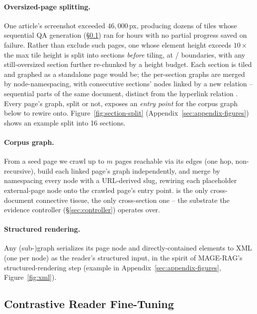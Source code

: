 \paragraph{Oversized-page splitting.} One article's screenshot exceeded $46{,}000$\,px, producing dozens of tiles whose sequential QA generation (\S\ref{sec:contrastive}) ran for hours with no partial progress saved on failure. Rather than exclude such pages, one whose element height exceeds $10\times$ the max tile height is split into sections \emph{before} tiling, at / boundaries, with any still-oversized section further re-chunked by a height budget. Each section is tiled and graphed as a standalone page would be; the per-section graphs are merged by node-namespacing, with consecutive sections'  nodes linked by a new \textbf{} relation -- sequential parts of the same document, distinct from the hyperlink relation . Every page's graph, split or not, exposes an \emph{entry point} for the corpus graph below to rewire onto. Figure~\ref{fig:section-split} (Appendix~\ref{sec:appendix-figures}) shows an example split into 16 sections.

\paragraph{Corpus graph.} From a seed page we crawl up to $m$ pages reachable via its  edges (one hop, non-recursive), build each linked page's graph independently, and merge by namespacing every node with a URL-derived slug, rewiring each placeholder external-page node onto the crawled page's entry point.  is the only cross-document connective tissue,  the only cross-section one -- the substrate the evidence controller (\S\ref{sec:controller}) operates over.

\paragraph{Structured rendering.} Any (sub-)graph serializes its page node and directly-contained elements to XML (one  per node) as the reader's structured input, in the spirit of MAGE-RAG's structured-rendering step (example in Appendix~\ref{sec:appendix-figures}, Figure~\ref{fig:xml}).

\subsection{Contrastive Reader Fine-Tuning}
\label{sec:contrastive}


